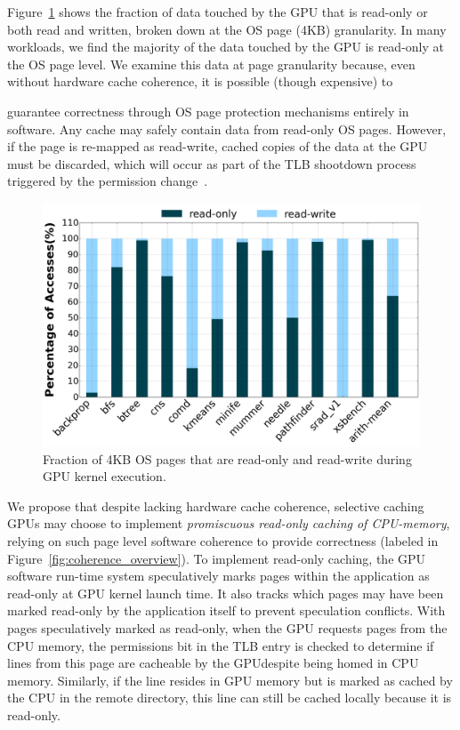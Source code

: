 Figure~\ref{fig:readonlymotivation} shows the fraction of data touched by the 
GPU that is read-only or both read and written, broken down at 
the OS page (4KB) granularity.  In many workloads, we find the majority 
of the data touched by the GPU is read-only at the OS page level.  We
examine this data at page granularity because, even without hardware 
cache coherence, it is possible (though expensive) to
guarantee correctness through OS page 
protection mechanisms entirely in software. 
Any cache may safely contain data from read-only OS pages.
However, if the page is re-mapped as read-write, cached copies
of the data at the GPU must be discarded, which will occur as part
of the TLB shootdown process triggered by the permission change~\cite{stenstrom1990}.

\begin{figure}[tp]
\centering
\includegraphics[width=1.0\columnwidth]{figures/read-only.png}
\caption{Fraction of 4KB OS pages that are read-only and read-write
during GPU kernel execution.}
\label{fig:readonlymotivation}
\end{figure}

We propose that despite lacking hardware cache coherence, selective caching GPUs may choose to implement 
\textit{promiscuous read-only caching of CPU-memory}, relying on such page level software coherence 
to provide correctness (labeled  in Figure~\ref{fig:coherence_overview}).  To implement read-only caching, the GPU software 
run-time system speculatively marks pages within the application as 
read-only at GPU kernel launch time.  It also tracks which pages may have been marked
read-only by the application itself to prevent speculation conflicts.  With pages speculatively
marked as read-only, when the GPU requests pages from the CPU memory, the permissions 
bit in the TLB entry is checked to determine if lines from this page are cacheable by the 
GPU\@ despite being homed in CPU memory. Similarly, if the line resides in GPU memory but is marked as cached by
the CPU in the remote directory, this line can still be cached locally because it is read-only.

